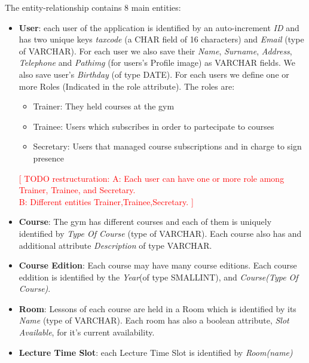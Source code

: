     The entity-relationship contains 8 main entities:
    \begin{itemize}
        \item 
        \textbf{User}: each user of the application is identified by an auto-increment \textit{ID} and has two unique keys \textit{tax\textunderscore code} (a CHAR field of 16 characters) and \textit{Email} (type of VARCHAR). 
    	For each user we also save their \textit{Name}, \textit{Surname}, \textit{Address}, \textit{Telephone} and \textit{Path\textunderscore img} (for users's Profile image) as VARCHAR fields. We also save user's \textit{Birthday} (of type DATE). For each users we define
        one or more Roles (Indicated in the role attribute). The roles are:
        \begin{itemize}
	    \item Trainer: They held courses at the gym 
    	\item Trainee: Users which subscribes in order to partecipate to courses
        \item Secretary: Users that managed course subscriptions and in charge to sign presence
        
        \end{itemize}
    	\textcolor{red}{[ TODO restructuration: A: Each user can have one or more role among Trainer,  Trainee, and Secretary.\\
    	  B: Different entities Trainer,Trainee,Secretary. ]}
    	
    	\item 
    	\textbf{Course}: The gym has different courses and each of them is uniquely identified by 
    	\textit{Type Of Course} (type of VARCHAR). Each course also has and additional attribute \textit{Description} of type VARCHAR.
    	
    	\item 
    	\textbf{Course Edition}: Each course may have many course editions. Each course eddition is identified by the \textit{Year}(of type SMALLINT), and \textit{Course(Type Of Course)}.
    	
    	\item 
    	\textbf{Room}: Lessons of each course are held in a Room which is identified by its \textit{Name} (type of VARCHAR). Each room has also a boolean attribute, \textit{Slot Available}, for it's current availability.
    	
    	\item \textbf{Lecture Time Slot}: each Lecture Time Slot is identified by \textit{Room(name)}
    	

\end{itemize}
